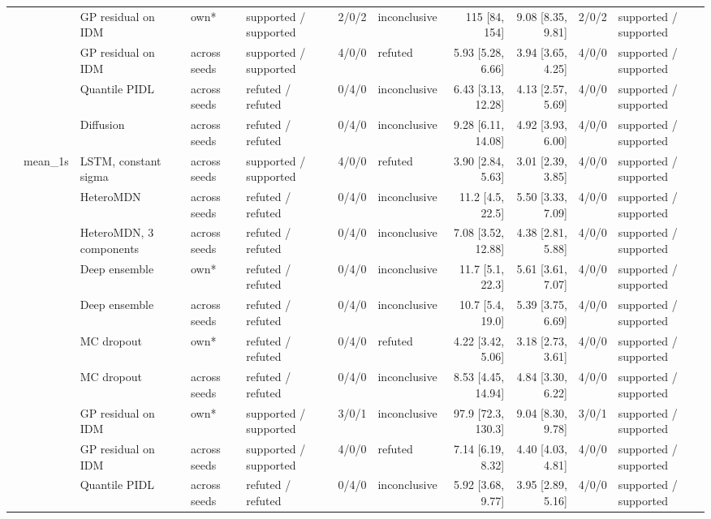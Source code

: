 \begin{longtable}{lllllrlrrrl}
 &  & GP residual on IDM & own* & supported / supported & 2/0/2 & inconclusive & 115 [84, 154] & 9.08 [8.35, 9.81] & 2/0/2 & supported / supported \\
 &  & GP residual on IDM & across seeds & supported / supported & 4/0/0 & refuted & 5.93 [5.28, 6.66] & 3.94 [3.65, 4.25] & 4/0/0 & supported / supported \\
 &  & Quantile PIDL & across seeds & refuted / refuted & 0/4/0 & inconclusive & 6.43 [3.13, 12.28] & 4.13 [2.57, 5.69] & 4/0/0 & supported / supported \\
 &  & Diffusion & across seeds & refuted / refuted & 0/4/0 & inconclusive & 9.28 [6.11, 14.08] & 4.92 [3.93, 6.00] & 4/0/0 & supported / supported \\
\midrule
 & mean\_1s & LSTM, constant sigma & across seeds & supported / supported & 4/0/0 & refuted & 3.90 [2.84, 5.63] & 3.01 [2.39, 3.85] & 4/0/0 & supported / supported \\
 &  & HeteroMDN & across seeds & refuted / refuted & 0/4/0 & inconclusive & 11.2 [4.5, 22.5] & 5.50 [3.33, 7.09] & 4/0/0 & supported / supported \\
 &  & HeteroMDN, 3 components & across seeds & refuted / refuted & 0/4/0 & inconclusive & 7.08 [3.52, 12.88] & 4.38 [2.81, 5.88] & 4/0/0 & supported / supported \\
 &  & Deep ensemble & own* & refuted / refuted & 0/4/0 & inconclusive & 11.7 [5.1, 22.3] & 5.61 [3.61, 7.07] & 4/0/0 & supported / supported \\
 &  & Deep ensemble & across seeds & refuted / refuted & 0/4/0 & inconclusive & 10.7 [5.4, 19.0] & 5.39 [3.75, 6.69] & 4/0/0 & supported / supported \\
 &  & MC dropout & own* & refuted / refuted & 0/4/0 & refuted & 4.22 [3.42, 5.06] & 3.18 [2.73, 3.61] & 4/0/0 & supported / supported \\
 &  & MC dropout & across seeds & refuted / refuted & 0/4/0 & inconclusive & 8.53 [4.45, 14.94] & 4.84 [3.30, 6.22] & 4/0/0 & supported / supported \\
 &  & GP residual on IDM & own* & supported / supported & 3/0/1 & inconclusive & 97.9 [72.3, 130.3] & 9.04 [8.30, 9.78] & 3/0/1 & supported / supported \\
 &  & GP residual on IDM & across seeds & supported / supported & 4/0/0 & refuted & 7.14 [6.19, 8.32] & 4.40 [4.03, 4.81] & 4/0/0 & supported / supported \\
 &  & Quantile PIDL & across seeds & refuted / refuted & 0/4/0 & inconclusive & 5.92 [3.68, 9.77] & 3.95 [2.89, 5.16] & 4/0/0 & supported / supported \\

\end{longtable}
